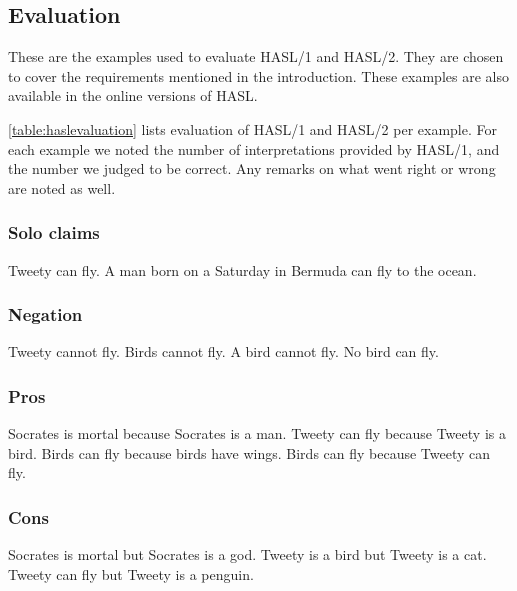 \subsection{Evaluation}
\label{sec:appevaluation}
These are the examples used to evaluate HASL/1 and HASL/2. They are chosen to cover the requirements mentioned in the introduction. These examples are also available in the online versions of HASL.

\autoref{table:haslevaluation} lists evaluation of HASL/1 and HASL/2 per example. For each example we noted the number of interpretations provided by HASL/1, and the number we judged to be correct. Any remarks on what went right or wrong are noted as well.

\subsubsection{Solo claims}
\begin{exe}
\ex\label{e1} Tweety can fly.
\ex\label{e2} A man born on a Saturday in Bermuda can fly to the ocean.
\end{exe}

\subsubsection{Negation}
\begin{exe}
\ex\label{e3} Tweety cannot fly.
\ex\label{e4} Birds cannot fly.
\ex\label{e5} A bird cannot fly.
\ex\label{e6} No bird can fly.
\end{exe}

\subsubsection{Pros}
\begin{exe}
\ex\label{e7} Socrates is mortal because Socrates is a man.
\ex\label{e8} Tweety can fly because Tweety is a bird.
\ex\label{e9} Birds can fly because birds have wings.
\ex\label{e70} Birds can fly because Tweety can fly.
\end{exe}

\subsubsection{Cons}
\begin{exe}
\ex\label{e10} Socrates is mortal but Socrates is a god.
\ex\label{e11} Tweety is a bird but Tweety is a cat.
\ex\label{e12} Tweety can fly but Tweety is a penguin.
\end{exe}


